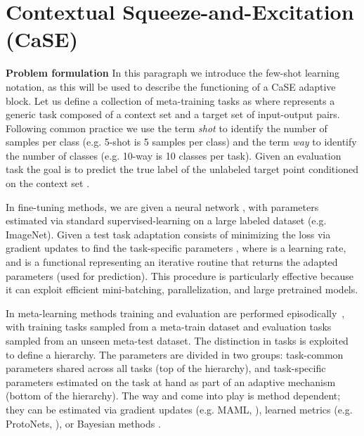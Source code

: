 \documentclass{article}
\begin{document}
\section{Contextual Squeeze-and-Excitation (CaSE)} \label{sec:contextual_squeeze_and_excitation}

\textbf{Problem formulation} In this paragraph we introduce the few-shot learning notation, as this will be used to describe the functioning of a CaSE adaptive block. Let us define a collection of meta-training tasks as  where  represents a generic task composed of a context set  and a target set  of input-output pairs. Following common practice we use the term \emph{shot} to identify the number of samples per class (e.g. 5-shot is 5 samples per class) and the term \emph{way} to identify the number of classes (e.g. 10-way is 10 classes per task). 
Given an evaluation task  the goal is to predict the true label  of the unlabeled target point  conditioned on the context set .

In fine-tuning methods, we are given a neural network , with parameters  estimated via standard supervised-learning on a large labeled dataset (e.g. ImageNet). Given a test task  adaptation consists of minimizing the loss  via gradient updates to find the task-specific parameters
, where  is a learning rate, and  is a functional representing an iterative routine that returns the adapted parameters  (used for prediction). This procedure is particularly effective because it can exploit efficient mini-batching, parallelization, and large pretrained models.

In meta-learning methods training and evaluation are performed episodically~\citep{vinyals2016matching}, with training tasks sampled from a meta-train dataset and evaluation tasks sampled from an unseen meta-test dataset. The distinction in tasks is exploited to define a hierarchy.
The parameters are divided in two groups:  task-common parameters shared across all tasks (top of the hierarchy), and  task-specific parameters estimated on the task at hand as part of an adaptive mechanism (bottom of the hierarchy). The way  and   come into play is method dependent; they can be estimated via gradient updates (e.g. MAML, \citealt{finn2017model}), learned metrics (e.g. ProtoNets, \citealt{snell2017prototypical}), or Bayesian methods \citep{gordon2018meta, patacchiola2020bayesian, sendera2021non}.
\end{document}
